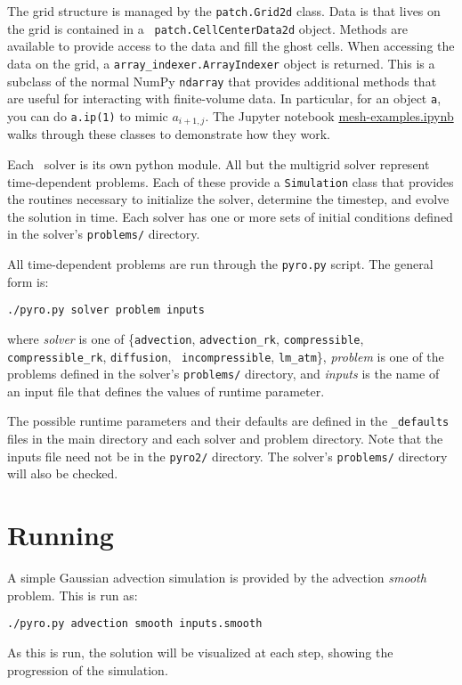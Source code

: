 The grid structure is managed by the {\tt patch.Grid2d} class.  Data
is that lives on the grid is contained in a {\tt
  patch.CellCenterData2d} object.  Methods are available to provide
access to the data and fill the ghost cells.  When accessing the data
on the grid, a {\tt array\_indexer.ArrayIndexer} object is returned.
This is a subclass of the normal NumPy {\tt ndarray} that provides
additional methods that are useful for interacting with finite-volume
data.  In particular, for an object {\tt a}, you can do {\tt a.ip(1)}
to mimic $a_{i+1,j}$.  The Jupyter notebook
\href{https://github.com/zingale/pyro2/blob/master/mesh/mesh-examples.ipynb}{mesh-examples.ipynb}
walks through these classes to demonstrate how they work.

Each \pyro\ solver is its own python module.  All but the multigrid
solver represent time-dependent problems.  Each of these provide a
{\tt Simulation} class that provides the routines necessary to
initialize the solver, determine the timestep, and evolve the solution
in time.  Each solver has one or more sets of initial conditions
defined in the solver's {\tt problems/} directory.

All time-dependent problems are run through the {\tt pyro.py} script.
The general form is:
\begin{verbatim}
./pyro.py solver problem inputs
\end{verbatim}
 where {\em solver} is one of \{{\tt advection}, {\tt advection\_rk},
 {\tt compressible}, {\tt compressible\_rk}, {\tt diffusion}, {\tt
   incompressible}, {\tt lm\_atm}\}, {\em problem} is one of the
 problems defined in the solver's {\tt problems/} directory, and {\em
   inputs} is the name of an input file that defines the values of
 runtime parameter.

The possible runtime parameters and their defaults are defined in the
{\tt \_defaults} files in the main directory and each solver and
problem directory.  Note that the inputs file need not be in the 
{\tt pyro2/} directory.  The solver's {\tt problems/} directory
will also be checked.

\section{Running \pyro}

A simple Gaussian advection simulation is provided by the advection
{\em smooth} problem.  This is run as:
\begin{verbatim}
./pyro.py advection smooth inputs.smooth
\end{verbatim}
As this is run, the solution will be visualized at each step,
showing the progression of the simulation.  


